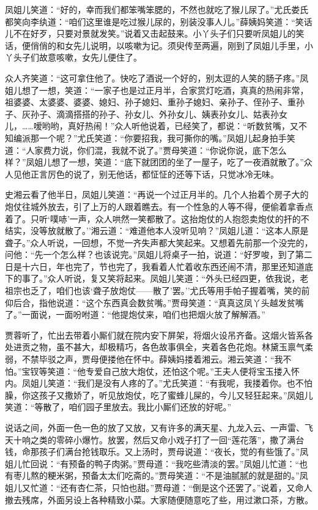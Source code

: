 凤姐儿笑道：``好的，幸而我们都笨嘴笨腮的，不然也就吃了猴儿尿了。''尤氏娄氏都笑向李纨道：``咱们这里谁是吃过猴儿尿的，别装没事人儿。''薛姨妈笑道：``笑话儿不在好歹，只要对景就发笑。''说着又击起鼓来。小丫头子们只要听凤姐儿的笑话，便俏俏的和女先儿说明，以咳嗽为记。须臾传至两遍，刚到了凤姐儿手里，小丫头子们故意咳嗽，女先儿便住了。

众人齐笑道：``这可拿住他了。快吃了酒说一个好的，别太逗的人笑的肠子疼。''凤姐儿想了一想，笑道：``一家子也是过正月半，合家赏灯吃酒，真真的热闹非常，祖婆婆、太婆婆、婆婆、媳妇、孙子媳妇、重孙子媳妇、亲孙子、侄孙子、重孙子、灰孙子、滴滴搭搭的孙子、孙女儿、外孙女儿、姨表孙女儿、姑表孙女儿，\ldots{}\ldots{}嗳哟哟，真好热闹！''众人听他说着，已经笑了，都说：``听数贫嘴，又不知编派那一个呢？''尤氏笑道：``你要招我，我可撕你的嘴。''凤姐儿起身拍手笑道：``人家费力说，你们混，我就不说了。''贾母笑道：``你说你说，底下怎么样？''凤姐儿想了一想，笑道：``底下就团团的坐了一屋子，吃了一夜酒就散了。''众人见他正言厉色的说了，别无他话，都怔怔的还等下话，只觉冰冷无味。

史湘云看了他半日，凤姐儿笑道：``再说一个过正月半的。几个人抬着个房子大的炮仗往城外放去，引了上万的人跟着瞧去。有一个性急的人等不得，便偷着拿香点着了。只听`噗哧'一声，众人哄然一笑都散了。这抬炮仗的人抱怨卖炮仗的扞的不结实，没等放就散了。''湘云道：``难道他本人没听见响？''凤姐儿道：``这本人原是聋子。''众人听说，一回想，不觉一齐失声都大笑起来。又想着先前那一个没完的，问他：``先一个怎么样？也该说完。''凤姐儿将桌子一拍，说道：``好罗唆，到了第二日是十六日，年也完了，节也完了，我看着人忙着收东西还闹不清，那里还知道底下的事了。''众人听说，复又笑将起来。凤姐儿笑道：``外头已经四更，依我说，老祖宗也乏了，咱们也该`聋子放炮仗------散了'罢。''尤氏等用手帕子握着嘴，笑的前仰后合，指他说道：``这个东西真会数贫嘴。''贾母笑道：``真真这凤丫头越发贫嘴了。''一面说，一面吩咐道：``他提炮仗来，咱们也把烟火放了解解酒。''

贾蓉听了，忙出去带着小厮们就在院内安下屏架，将烟火设吊齐备。这烟火皆系各处进贡之物，虽不甚大，却极精巧，各色故事俱全，夹着各色花炮。林黛玉禀气柔弱，不禁毕驳之声，贾母便搂他在怀中。薛姨妈搂着湘云。湘云笑道：``我不怕。''宝钗等笑道：``他专爱自己放大炮仗，还怕这个呢。''王夫人便将宝玉搂入怀内。凤姐儿笑道：``我们是没有人疼的了。''尤氏笑道：``有我呢，我搂着你。也不怕臊，你这孩子又撒娇了，听见放炮仗，吃了蜜蜂儿屎的，今儿又轻狂起来。''凤姐儿笑道：``等散了，咱们园子里放去。我比小厮们还放的好呢。''

说话之间，外面一色一色的放了又放，又有许多的满天星、九龙入云、一声雷、飞天十响之类的零碎小爆竹。放罢，然后又命小戏子打了一回``莲花落''，撒了满台钱，命那孩子们满台抢钱取乐。又上汤时，贾母说道：``夜长，觉的有些饿了。''凤姐儿忙回说：``有预备的鸭子肉粥。''贾母道：``我吃些清淡的罢。''凤姐儿忙道：``也有枣儿熬的粳米粥，预备太太们吃斋的。''贾母笑道：``不是油腻腻的就是甜的。''凤姐儿又忙道：``还有杏仁茶，只怕也甜。''贾母道：``倒是这个还罢了。''说着，又命人撤去残席，外面另设上各种精致小菜。大家随便随意吃了些，用过漱口茶，方散。

